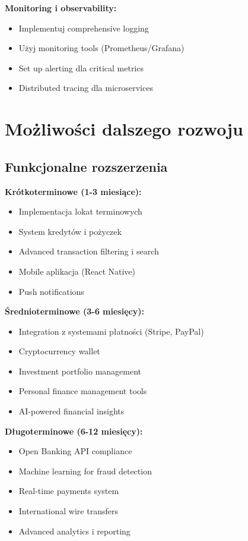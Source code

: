 \documentclass[12pt,a4paper]{article}
\begin{document}
    \textbf{Monitoring i observability:}
    \begin{itemize}
        \item Implementuj comprehensive logging
        \item Użyj monitoring tools (Prometheus/Grafana)
        \item Set up alerting dla critical metrics
        \item Distributed tracing dla microservices
    \end{itemize}

    \section{Możliwości dalszego rozwoju}

    \subsection{Funkcjonalne rozszerzenia}

    \textbf{Krótkoterminowe (1-3 miesiące):}
    \begin{itemize}
        \item Implementacja lokat terminowych
        \item System kredytów i pożyczek
        \item Advanced transaction filtering i search
        \item Mobile aplikacja (React Native)
        \item Push notifications
    \end{itemize}

    \textbf{Średnioterminowe (3-6 miesięcy):}
    \begin{itemize}
        \item Integration z systemami płatności (Stripe, PayPal)
        \item Cryptocurrency wallet
        \item Investment portfolio management
        \item Personal finance management tools
        \item AI-powered financial insights
    \end{itemize}

    \textbf{Długoterminowe (6-12 miesięcy):}
    \begin{itemize}
        \item Open Banking API compliance
        \item Machine learning for fraud detection
        \item Real-time payments system
        \item International wire transfers
        \item Advanced analytics i reporting
    \end{itemize}
\end{document}
